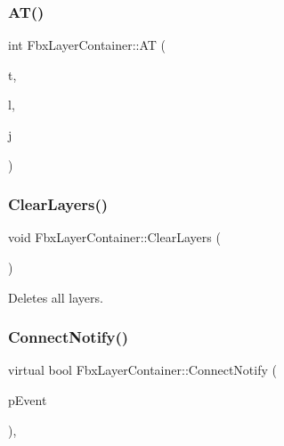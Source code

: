 \mbox{\label{class_fbx_layer_container_abd3b8871f32f8af58c029fedcae6e7de}} 
\subsubsection{\texorpdfstring{A\+T()}{AT()}}
{\footnotesize\ttfamily int Fbx\+Layer\+Container\+::\+AT (\begin{DoxyParamCaption}\item[{void $\ast$}]{t,  }\item[{\hyperlink{fbxtypes_8h_ae9fb141d8158a730aa85ec5ff2ea3f6b}{Fbx\+U\+Int}}]{l,  }\item[{int}]{j }\end{DoxyParamCaption})}

\mbox{\label{class_fbx_layer_container_a6b0b68caee343bddb68d1d1bd57c360f}} 
\subsubsection{\texorpdfstring{Clear\+Layers()}{ClearLayers()}}
{\footnotesize\ttfamily void Fbx\+Layer\+Container\+::\+Clear\+Layers (\begin{DoxyParamCaption}{ }\end{DoxyParamCaption})}



Deletes all layers. 

\mbox{\label{class_fbx_layer_container_a7fe50204f62a2d4db056cc730c1eba18}} 
\subsubsection{\texorpdfstring{Connect\+Notify()}{ConnectNotify()}}
{\footnotesize\ttfamily virtual bool Fbx\+Layer\+Container\+::\+Connect\+Notify (\begin{DoxyParamCaption}\item[{\hyperlink{class_fbx_connect_event}{Fbx\+Connect\+Event} const \&}]{p\+Event }\end{DoxyParamCaption})\hspace{0.3cm}{\ttfamily [protected]}, {\ttfamily [virtual]}}



